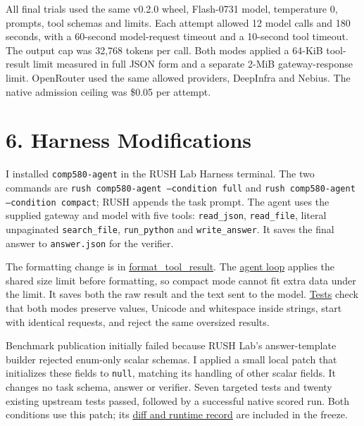 \documentclass[10pt,letterpaper]{article}
\begin{document}
All final trials used the same v0.2.0 wheel, Flash-0731 model, temperature 0, prompts, tool schemas and limits. Each attempt allowed 12 model calls and 180 seconds, with a 60-second model-request timeout and a 10-second tool timeout. The output cap was 32,768 tokens per call. Both modes applied a 64-KiB tool-result limit measured in full JSON form and a separate 2-MiB gateway-response limit. OpenRouter used the same allowed providers, DeepInfra and Nebius. The native admission ceiling was \$0.05 per attempt.

\section*{6. Harness Modifications}

I installed \texttt{comp580-agent} in the RUSH Lab Harness terminal. The two commands are \texttt{rush comp580-agent --condition full} and \texttt{rush comp580-agent --condition compact}; RUSH appends the task prompt. The agent uses the supplied gateway and model with five tools: \texttt{read\_json}, \texttt{read\_file}, literal unpaginated \texttt{search\_file}, \texttt{run\_python} and \texttt{write\_answer}. It saves the final answer to \texttt{answer.json} for the verifier.

The formatting change is in \href{https://github.com/a-little-hoof/580-final/blob/main/src/comp580\_agent/tools.py}{format\_tool\_result}. The \href{https://github.com/a-little-hoof/580-final/blob/main/src/comp580\_agent/agent.py}{agent loop} applies the shared size limit before formatting, so compact mode cannot fit extra data under the limit. It saves both the raw result and the text sent to the model. \href{https://github.com/a-little-hoof/580-final/blob/main/tests/test\_compact.py}{Tests} check that both modes preserve values, Unicode and whitespace inside strings, start with identical requests, and reject the same oversized results.

Benchmark publication initially failed because RUSH Lab's answer-template builder rejected enum-only scalar schemas. I applied a small local patch that initializes these fields to \texttt{null}, matching its handling of other scalar fields. It changes no task schema, answer or verifier. Seven targeted tests and twenty existing upstream tests passed, followed by a successful native scored run. Both conditions use this patch; its \href{https://github.com/a-little-hoof/580-final/blob/main/study/controlled/development/platform-fix/README.md}{diff and runtime record} are included in the freeze.
\end{document}
